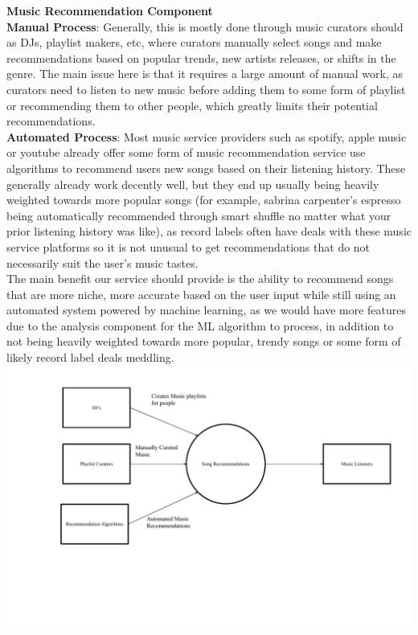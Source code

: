 \documentclass[12pt]{article}
\begin{document}
\noindent\textbf{Music Recommendation Component}
\\\textbf{Manual Process}: Generally, this is mostly done through music curators should as DJs, playlist makers,
etc, where curators manually select songs and make recommendations based on popular trends, new artists releases,
or shifts in the genre. The main issue here is that it requires a large amount of manual work, as curators need to 
listen to new music before adding them to some form of playlist or recommending them to other people, which greatly
limits their potential recommendations. 
\\\textbf{Automated Process}: Most music service providers such as spotify, apple music or youtube already offer 
some form of music recommendation service use algorithms to recommend users new songs based on their listening history.
These generally already work decently well, but they end up usually being heavily weighted towards more popular songs 
(for example, sabrina carpenter's espresso being automatically recommended through smart shuffle no matter what your prior listening history was like), 
as record labels often have deals with these music service platforms so it is not unusual to get recommendations that 
do not necessarily suit the user's music tastes. 
\\The main benefit our service should provide is the ability to recommend songs that are more niche, more accurate based
on the user input while still using an automated system powered by machine learning, as we would have more features due 
to the analysis component for the ML algorithm to process, in addition to not being heavily weighted towards more popular,
trendy songs or some form of likely record label deals meddling. 
\\\includegraphics[width=\textwidth]{6_1_a.pdf}
\end{document}
